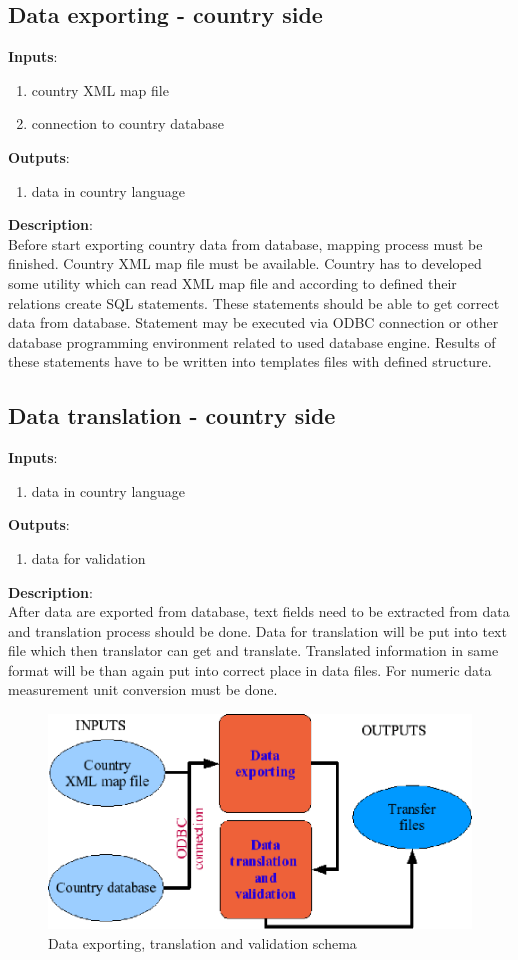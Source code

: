 \subsection{Data exporting - country side}
\label{sub:exportdata}
\textbf{Inputs}:
\begin{enumerate}
\item country XML map file
\item connection to country database
\end{enumerate}
\textbf{Outputs}:
\begin{enumerate}
\item data in country language
\end{enumerate}
\textbf{Description}:\\
Before start exporting country data from database, mapping process must be finished. Country XML map file must be available. Country has to developed some utility which can read XML map file and according to defined their relations create SQL statements. These statements should be able to get correct data from database. Statement may be executed via ODBC connection or other database programming environment related to used database engine. Results of these statements have to be written into templates files with defined structure.

\subsection{Data translation - country side}
\label{sub:translatedata}
\textbf{Inputs}:
\begin{enumerate}
\item data in country language
\end{enumerate}
\textbf{Outputs}:
\begin{enumerate}
\item data for validation
\end{enumerate}
\textbf{Description}:\\
After data are exported from database, text fields need to be extracted from data and translation process should be done. Data for translation will be put into text file which then translator can get and translate. Translated information in same format will be than again put into correct place in data files. For numeric data measurement unit conversion must be done. 
\begin{figure}[ht]
   \centering
   \includegraphics{./loading_from_other_db/schema3b.eps}
   \caption{Data exporting, translation and validation schema}
   \label{fig:schema3}
\end{figure}
